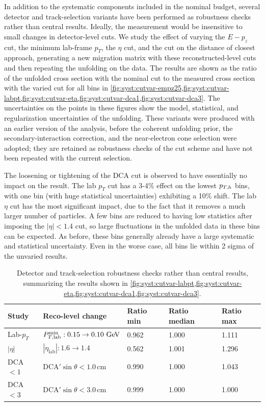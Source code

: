 In addition to the systematic components included in the nominal budget, several
detector and track-selection variants have been performed as robustness checks
rather than central results. Ideally, the measurement would be insensitive to
small changes in detector-level cuts. We study the effect of varying the $E-p_z$
cut, the minimum lab-frame $p_T$, the $\eta$ cut, and the cut on the distance of
closest approach, generating a new migration matrix with these reconstructed-level
cuts and then repeating the unfolding on the data. The results are
shown as the ratio of the unfolded cross section with the nominal cut to the
measured cross section with the varied cut for all bins in
\cref{fig:syst:cutvar-empz25,fig:syst:cutvar-labpt,fig:syst:cutvar-eta,fig:syst:cutvar-dca1,fig:syst:cutvar-dca3}. The uncertainties on the points in these figures show the model, statistical, and regularization uncertainties of the unfolding.
These variants were produced with an earlier version of the analysis, before
the coherent unfolding prior, the secondary-interaction correction, and the
near-electron cone selection were adopted; they are retained as robustness checks of the cut scheme and
have not been repeated with the current selection.

The loosening or tightening of the DCA cut is observed to have essentially no impact on the result. The lab $p_T$ cut has a 3-4\% effect on the lowest $p_{T,h}$ bins, with one bin (with huge statistical uncertainties) exhibiting a 10\% shift. The lab $\eta$ cut has the most significant impact, due to the fact that it removes a much larger number of particles. A few bins are reduced to having low statistics after imposing the $|\eta|<1.4$ cut, so large fluctuations in the unfolded data in these bins can be expected. As before, these bins generally already have a large systematic and statistical uncertainty. Even in the worse case, all bins lie within 2 sigma of the unvaried results.


\begin{table}[h]
\centering
\small
\begin{tabular}{p{2.5cm}p{4.7cm}p{2.1cm}p{2.1cm}p{2.1cm}}
\toprule
Study & Reco-level change  & Ratio min & Ratio median & Ratio max\\
\midrule
Lab-$p_T$ & $P_{T,\mathrm{lab}}^{\min}:0.15\rightarrow0.10~\text{GeV}$  & 0.962 & 1.000 & 1.111 \\
$|\eta|$ & $|\eta_{\mathrm{lab}}|:1.6\rightarrow1.4$ & 0.562 & 1.001 & 1.296 \\
DCA$<1$ & $\mathrm{DCA}'\sin\theta < 1.0\,\mathrm{cm}$  & 0.990 & 1.000 & 1.043 \\
DCA$<3$ & $\mathrm{DCA}'\sin\theta < 3.0\,\mathrm{cm}$ & 0.999 & 1.000 & 1.000 \\
\bottomrule
\end{tabular}
\caption{Detector and track-selection robustness checks rather than central results, summarizing the results shown in \cref{fig:syst:cutvar-labpt,fig:syst:cutvar-eta,fig:syst:cutvar-dca1,fig:syst:cutvar-dca3}.}
\label{tab:syst:cut-variation-summary}
\end{table}

